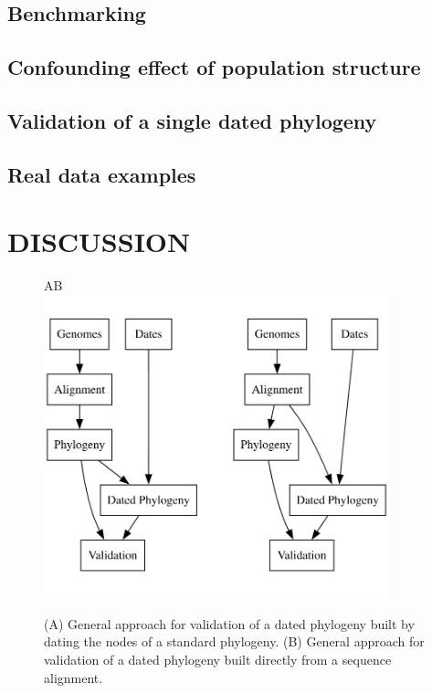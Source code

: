 \documentclass{article}
\begin{document}
\subsection*{Benchmarking}

\subsection*{Confounding effect of population structure} 

\subsection*{Validation of a single dated phylogeny}

\subsection*{Real data examples}

\section*{DISCUSSION}

\begin{figure}[p!]
\begin{center}
A\hspace*{6cm}B\hspace*{6cm}~\\
\includegraphics[width=10cm]{fig1.png}
\end{center}
\caption{(A) General approach for validation of a dated phylogeny built by dating the nodes of a standard phylogeny. (B) General approach for validation of a dated phylogeny built directly from a sequence alignment.
\label{fig:approach}}
\end{figure}
\end{document}
